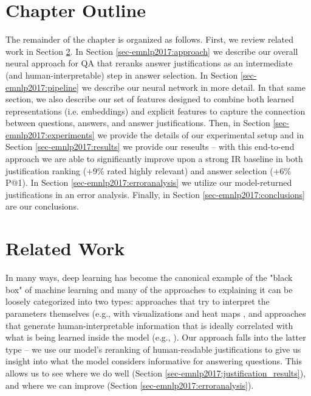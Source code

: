 \section{Chapter Outline}
The remainder of the chapter is organized as follows.  First, we review related work in Section \ref{sec-emnlp2017:relatedwork}.  In Section \ref{sec-emnlp2017:approach} we describe our overall neural approach for QA that reranks answer justifications as an intermediate (and human-interpretable) step in answer selection. In Section \ref{sec-emnlp2017:pipeline} we describe our neural network in more detail.  In that same section, we also describe our set of features designed to combine both learned representations (i.e. embeddings) and explicit features to capture the connection between questions, answers, and answer justifications.  Then, in Section \ref{sec-emnlp2017:experiments} we provide the details of our experimental setup and in Section \ref{sec-emnlp2017:results} we provide our reseults -- with this end-to-end approach we are able to significantly improve upon a strong IR baseline in both justification ranking (+9\% rated highly relevant) and answer selection (+6\% P@1).  In Section \ref{sec-emnlp2017:erroranalysis} we utilize our model-returned justifications in an error analysis.  Finally, in Section \ref{sec-emnlp2017:conclusions} are our conclusions.



\section{Related Work}
\label{sec-emnlp2017:relatedwork}
In many ways, deep learning has become the canonical example of the "black box" of machine learning and many of the approaches to explaining it can be loosely categorized into two types: approaches that try to interpret the parameters themselves (e.g., with visualizations and heat maps \citep{Zeiler2014VisualizingAU,nips15_hermann, Li2016VisualizingAU}, and approaches that generate human-interpretable information that is ideally correlated with what is being learned inside the model (e.g., \citet{Lei2016RationalizingNP}). Our approach falls into the latter type -- 
we use our model's reranking of human-readable justifications to give us insight into what the model considers informative for answering questions.  This allows us to see where we do well (Section \ref{sec-emnlp2017:justification_results}), and where we can improve (Section  \ref{sec-emnlp2017:erroranalysis}).

